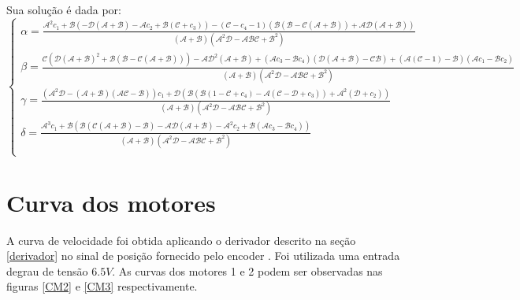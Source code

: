 \documentclass[]{politex}
\begin{document}
Sua solução é dada por:
\begin{equation}
\begin{cases}
\alpha = \frac{\mathcal{A}^2 c_1+\mathcal{B} \left(-\mathcal{D} (\mathcal{A}+\mathcal{B})-\mathcal{A} c_2+ \mathcal{B} (\mathcal{C}+ c_3) \right)-\left(\mathcal{C} -c_4 - 1 \right) (\mathcal{B} (\mathcal{B}-\mathcal{C} (\mathcal{A}+\mathcal{B}))+\mathcal{A} \mathcal{D} (\mathcal{A}+\mathcal{B}))}{(\mathcal{A}+\mathcal{B}) \left(\mathcal{A}^2 \mathcal{D}-\mathcal{A} \mathcal{B} \mathcal{C}+\mathcal{B}^2\right)} \\
\beta = \frac{\mathcal{C} \left( \mathcal{D} (\mathcal{A}+\mathcal{B})^2+ \mathcal{B} (\mathcal{B}-\mathcal{C} (\mathcal{A}+\mathcal{B})) \right)-\mathcal{A} \mathcal{D}^2 (\mathcal{A}+\mathcal{B})+\left(\mathcal{A} c_3- \mathcal{B} c_4 \right) (\mathcal{D} (\mathcal{A}+\mathcal{B})-\mathcal{C} \mathcal{B})+ (\mathcal{A} (\mathcal{C}-1)-\mathcal{B})(\mathcal{A} c_1 - \mathcal{B} c_2)}{(\mathcal{A}+\mathcal{B}) \left(\mathcal{A}^2 \mathcal{D}-\mathcal{A} \mathcal{B} \mathcal{C}+\mathcal{B}^2\right)} \\
\gamma = \frac{ \left(\mathcal{A}^2 \mathcal{D}-(\mathcal{A}+\mathcal{B}) (\mathcal{A} \mathcal{C}-\mathcal{B})\right)c_1 +\mathcal{D} \left(\mathcal{B} \left( \mathcal{B} (1-\mathcal{C} + c_4) - \mathcal{A} (\mathcal{C} - \mathcal{D} + c_3) \right)+\mathcal{A}^2( \mathcal{D}+ c_2) \right)}{(\mathcal{A}+\mathcal{B}) \left(\mathcal{A}^2 \mathcal{D}-\mathcal{A} \mathcal{B} \mathcal{C}+\mathcal{B}^2\right)} \\
\delta = \frac{\mathcal{A}^3 c_1+\mathcal{B} \left(\mathcal{B} (\mathcal{C} (\mathcal{A}+\mathcal{B})-\mathcal{B})-\mathcal{A} \mathcal{D} (\mathcal{A}+\mathcal{B})-\mathcal{A}^2 c_2 +\mathcal{B} \left(\mathcal{A} c_3- \mathcal{B} c_4 \right)\right)}{(\mathcal{A}+\mathcal{B}) \left(\mathcal{A}^2 \mathcal{D}-\mathcal{A} \mathcal{B} \mathcal{C}+\mathcal{B}^2\right)} \\
\end{cases}
\end{equation}



\chapter{Curva dos motores} \label{apendiceD}

A curva de velocidade foi obtida aplicando o derivador descrito na seção \ref{derivador} no sinal de posição fornecido pelo encoder . Foi utilizada uma entrada degrau de tensão $6.5V$. As curvas dos motores 1 e 2 podem ser observadas nas figuras \ref{CM2} e \ref{CM3} respectivamente.
\end{document}
